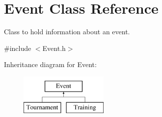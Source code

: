 \hypertarget{class_event}{}\section{Event Class Reference}
\label{class_event}


Class to hold information about an event.  




{\ttfamily \#include $<$Event.\+h$>$}

Inheritance diagram for Event\+:\begin{figure}[H]
\begin{center}
\leavevmode
\includegraphics[height=2.000000cm]{class_event}
\end{center}
\end{figure}

